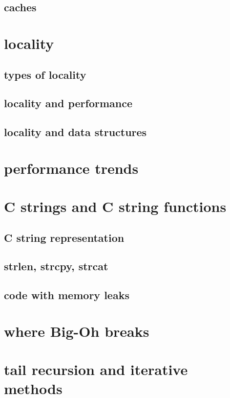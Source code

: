 

\subsection{caches}



\section{locality}

\subsection{types of locality}



\subsection{locality and performance}



\subsection{locality and data structures}



\section{performance trends}


\section{C strings and C string functions}

\subsection{C string representation}




\subsection{strlen, strcpy, strcat}



\subsection{code with memory leaks}





\section{where Big-Oh breaks}



\section{tail recursion and iterative methods}


